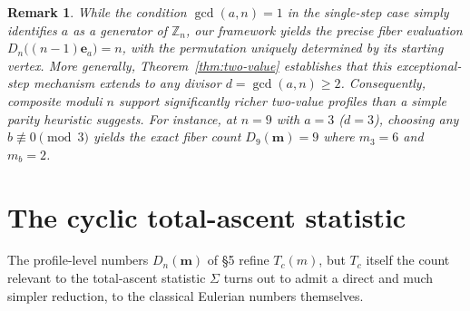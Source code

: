 \documentclass[11pt,a4paper]{amsart}
\newtheorem{remark}[theorem]{Remark}
\newcommand{\1}{\mathbf{1}}
\begin{document}
\begin{remark}\label{rem:single-step-and-two-value}
While the condition $\gcd(a, n) = 1$ in the single-step case simply identifies $a$ as a generator of $\mathbb{Z}_n$, our framework yields the precise fiber evaluation $D_n\bigl((n-1)\mathbf{e}_a\bigr) = n$, with the permutation uniquely determined by its starting vertex. More generally, Theorem~\ref{thm:two-value} establishes that this exceptional-step mechanism extends to any divisor $d = \gcd(a, n) \ge 2$. Consequently, composite moduli $n$ support significantly richer two-value profiles than a simple parity heuristic suggests. For instance, at $n = 9$ with $a = 3$ ($d = 3$), choosing any $b \not\equiv 0 \pmod 3$ yields the exact fiber count $D_9(\mathbf{m}) = 9$ where $m_3 = 6$ and $m_b = 2$.
\end{remark}

\section{The cyclic total-ascent statistic}\label{sec:Tc-reduction}

The profile-level numbers $D_n(\mathbf m)$ of \S5 refine $T_c(m)$, but $T_c$ itself the count relevant to the total-ascent statistic $\Sigma$ turns out to admit a direct and much simpler reduction, to the classical Eulerian numbers themselves.
\end{document}
